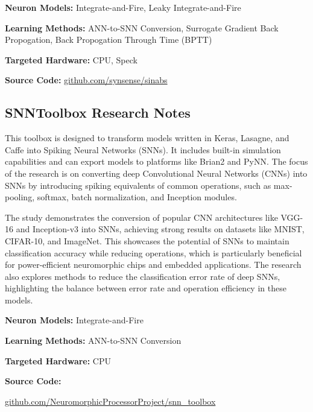\begin{tcolorbox}[enhanced,attach boxed title to top center={yshift=-3mm,yshifttext=-1mm}, colback=blue!5!white,colframe=blue!75!black,colbacktitle=red!80!black, title=SINABS at a Glance,fonttitle=\bfseries, boxed title style={size=small,colframe=red!50!black} ]

\textbf{Neuron Models:} Integrate-and-Fire, Leaky Integrate-and-Fire

\textbf{Learning Methods:} ANN-to-SNN Conversion, Surrogate Gradient Back Propogation, Back Propogation Through Time (BPTT)  

\textbf{Targeted Hardware:} CPU, Speck 

\textbf{Source Code:} \href{https://github.com/synsense/sinabs}{github.com/synsense/sinabs}
\end{tcolorbox}
\subsection*{SNNToolbox Research Notes}\label{SNNToolbox}

This toolbox is designed to transform models written in Keras, Lasagne, and Caffe into Spiking Neural Networks (SNNs). It includes built-in simulation capabilities and can export models to platforms like Brian2 and PyNN. The focus of the research is on converting deep Convolutional Neural Networks (CNNs) into SNNs by introducing spiking equivalents of common operations, such as max-pooling, softmax, batch normalization, and Inception modules.

The study demonstrates the conversion of popular CNN architectures like VGG-16 and Inception-v3 into SNNs, achieving strong results on datasets like MNIST, CIFAR-10, and ImageNet. This showcases the potential of SNNs to maintain classification accuracy while reducing operations, which is particularly beneficial for power-efficient neuromorphic chips and embedded applications. The research also explores methods to reduce the classification error rate of deep SNNs, highlighting the balance between error rate and operation efficiency in these models.

\begin{tcolorbox}[enhanced,attach boxed title to top center={yshift=-3mm,yshifttext=-1mm}, colback=blue!5!white,colframe=blue!75!black,colbacktitle=red!80!black, title=SNNToolbox at a Glance,fonttitle=\bfseries, boxed title style={size=small,colframe=red!50!black} ]

\textbf{Neuron Models:} Integrate-and-Fire

\textbf{Learning Methods:} ANN-to-SNN Conversion  

\textbf{Targeted Hardware:} CPU 

\textbf{Source Code:} 

\href{https://github.com/NeuromorphicProcessorProject/snn_toolbox}{github.com/NeuromorphicProcessorProject/snn\_toolbox}
\end{tcolorbox}
